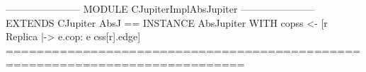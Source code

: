 \documentclass[preview, border={5pt 0pt 5pt 1pt}]{standalone}
\begin{document}
\begin{tla}
----------------------- MODULE CJupiterImplAbsJupiter -----------------------
EXTENDS CJupiter
AbsJ == INSTANCE AbsJupiter
            WITH copss <- [r \in Replica |-> {e.cop: e \in css[r].edge}]
=============================================================================
\end{tla}
\begin{tlatex}
 \@x{}\moduleLeftDash{}\moduleRightDash\@xx{}%
%
%
\@x{}\bottombar\@xx{}%
\end{tlatex}
\end{document}
